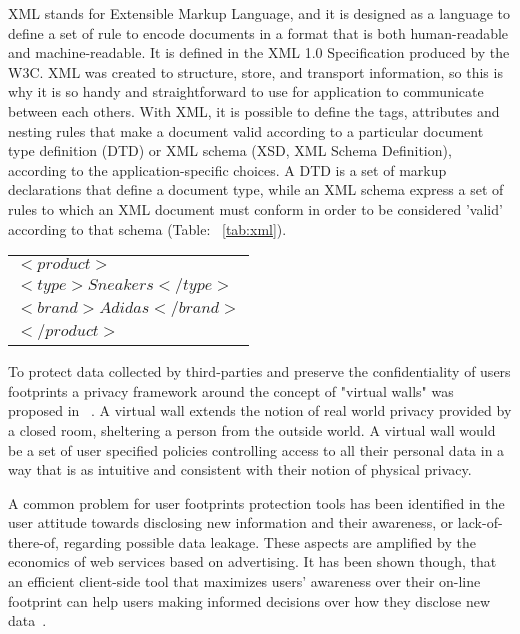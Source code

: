 XML stands for Extensible Markup Language, and it is designed as a language to define a set of rule to encode documents in a format that is both human-readable and machine-­readable. It is defined in the XML 1.0 Specification produced by the W3C. XML was created to structure, store, and transport information, so this is why it is so handy and straightforward to use for application to communicate between each others. With XML, it is possible to define the tags, attributes and nesting rules that make a document valid according to a particular document type definition (DTD) or XML schema (XSD, XML Schema Definition), according to the application­-specific choices. A DTD is a set of markup declarations that define a document type, while an XML schema express a set of rules to which an XML document must conform in order to be considered 'valid' according to that schema (Table: ~\ref{tab:xml}).
\\
\begin{table*}[ht]
\centering
\begin{tabular}{| l |}
\hline
$<product>$\\
  $<type>Sneakers</type>$\\
  $<brand>Adidas</brand>$\\
$</product>$\\
\hline
\end{tabular}
\caption{An XML example}
\label{tab:xml}
\end{table*}

To protect data collected by third-parties and preserve the confidentiality of users footprints a privacy framework around the concept of "virtual walls" was proposed in ~\cite{kapadia2007virtual}. A virtual wall extends the notion of real world privacy provided by a closed room, sheltering a person from the outside world. A virtual wall would be a set of user specified policies controlling access to all their personal data
in a way that is as intuitive and consistent with their notion of physical privacy.

A common problem for user footprints protection tools has been identified in the user attitude towards disclosing new information and their awareness, or lack-of-there-of, regarding possible data leakage. These aspects are amplified by the economics of web services based on advertising. It has been shown though, that an efficient client-side tool that maximizes users’ awareness over their on-line footprint can help users making informed decisions
over how they disclose new data~\cite{malandrino2013privacy}.

